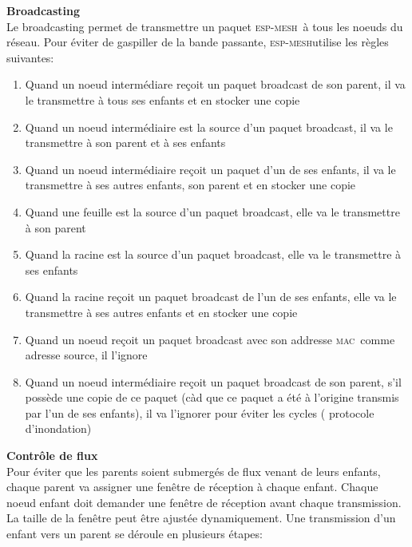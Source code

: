 \documentclass[a4paper, 12pt]{report}
\newcommand{\espmesh}{\textsc{esp-mesh}}
\newcommand{\mac}{\textsc{mac}}
\begin{document}
        \vspace{0.5cm}
        \textbf{Broadcasting}\\
            Le broadcasting permet de transmettre un paquet \espmesh\ à tous les noeuds du réseau. Pour éviter de gaspiller de
            la bande passante, \espmesh utilise les règles suivantes:
            \begin{enumerate}
                \item Quand un noeud intermédiare reçoit un paquet broadcast de son parent, il va le transmettre à tous ses enfants
                    et en stocker une copie
                \item Quand un noeud intermédiaire est la source d'un paquet broadcast, il va le transmettre à son parent et à ses enfants
                \item Quand un noeud intermédiaire reçoit un paquet d'un de ses enfants, il va le transmettre à ses autres enfants, son parent
                    et en stocker une copie
                \item Quand une feuille est la source d'un paquet broadcast, elle va le transmettre à son parent
                \item Quand la racine est la source d'un paquet broadcast, elle va le transmettre à ses enfants
                \item Quand la racine reçoit un paquet broadcast de l'un de ses enfants, elle va le transmettre à ses autres enfants et en stocker une copie
                \item Quand un noeud reçoit un paquet broadcast avec son addresse \mac\ comme adresse source, il l'ignore
                \item Quand un noeud intermédiaire reçoit un paquet broadcast de son parent, s'il possède une copie de ce paquet (càd que ce paquet a été à l'origine transmis par l'un de ses enfants), il va l'ignorer
                    pour éviter les cycles ( protocole d'inondation)
            \end{enumerate}
        \vspace{0.5cm}
        \textbf{Contrôle de flux}\\%
            Pour éviter que les parents soient submergés de flux venant de leurs enfants, chaque parent va
            assigner une fenêtre de réception à chaque enfant. Chaque noeud enfant doit demander une fenêtre
            de réception avant chaque transmission. La taille de la fenêtre peut être ajustée dynamiquement.
            Une transmission d'un enfant vers un parent se déroule en plusieurs étapes:
\end{document}
